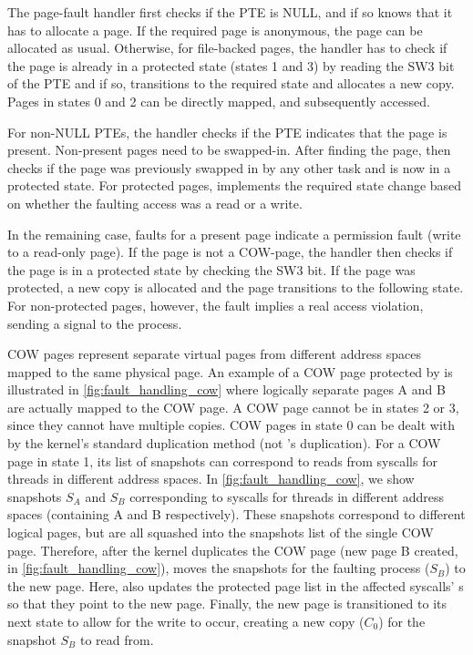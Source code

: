 \documentclass[letterpaper,twocolumn,10pt]{article}
\begin{document}
The page-fault handler first checks if the PTE is NULL, and if so 
knows that it has to allocate a page. 
If the required page is anonymous, the page can be allocated as usual.
Otherwise, for file-backed pages, the handler has to check if the 
page is already in a protected state (states 1 and 3) by reading 
the SW3 bit of the PTE and if so, transitions to the required state
and allocates a new copy. 
Pages in states 0 and 2 can be directly mapped, and subsequently
accessed.

For non-NULL PTEs, the handler checks if the PTE indicates that the 
page is present.
Non-present pages need to be swapped-in.
After finding the page, \tiktok then checks if the page was previously 
swapped in by any other task and is now in a protected state.
For protected pages, \tiktok implements the required state change based 
on whether the faulting access was a read or a write.

In the remaining case, faults for a present page indicate a 
permission fault (write to a read-only page).
If the page is not a COW-page, the handler then checks if the page
is in a protected state by checking the SW3 bit.
If the page was protected, a new copy is allocated and the page 
transitions to the following state.
For non-protected pages, however, the fault implies a real access
violation, sending a signal to the process.

COW pages represent separate virtual pages from different 
address spaces mapped to the same physical page.
An example of a COW page protected by \tiktok is illustrated in 
\autoref{fig:fault_handling_cow} where logically separate pages A and B 
are actually mapped to the COW page.
A COW page cannot be in states 2 or 3, since they cannot have multiple
\tiktok copies.
COW pages in state 0 can be dealt with by the kernel's standard
duplication method (not \tiktok's duplication).
For a COW page in state 1, its list of snapshots can correspond to 
reads from syscalls for threads in different address spaces.
In \autoref{fig:fault_handling_cow}, we show snapshots $S_A$ and 
$S_B$ corresponding to syscalls for threads in different address 
spaces (containing A and B respectively).
These snapshots correspond to different logical pages, but are 
all squashed into the snapshots list of the single COW page. 
Therefore, after the kernel duplicates the COW page (new page
B created, in \autoref{fig:fault_handling_cow}), \tiktok moves 
the snapshots for the faulting process ($S_B$) to the new page.
Here, \tiktok also updates the protected page list in the 
affected syscalls' s so that they point to the 
new page.
Finally, the new page is transitioned to its next state to allow 
for the write to occur, creating a new copy ($C_0$) for the
snapshot $S_B$ to read from.
\end{document}
